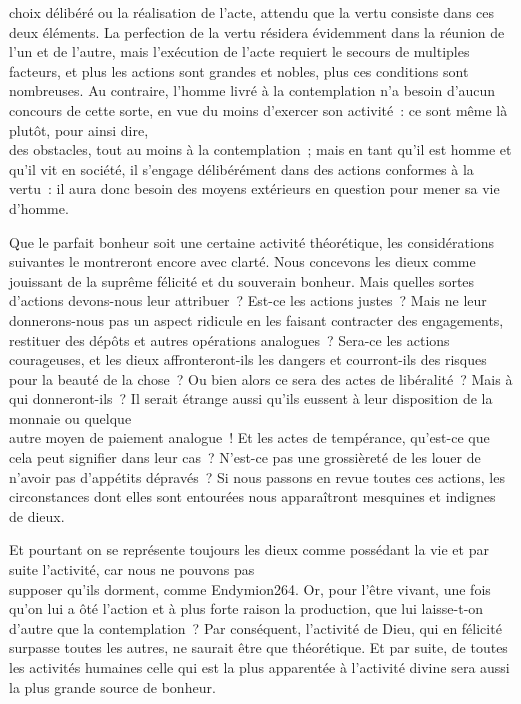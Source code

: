 \documentclass[french,twoside]{book} %
\begin{document}
choix délibéré ou la réalisation de l’acte, attendu que la vertu  consiste dans ces deux éléments. La perfection de la vertu résidera évidemment dans la réunion de l’un et de l’autre, mais l’exécution de l’acte requiert le secours de multiples facteurs, et plus les actions sont grandes et nobles, plus ces conditions sont nombreuses. Au contraire, l’homme livré à la contemplation n’a besoin d’aucun concours de cette sorte, en vue du moins d’exercer son activité : ce sont même là plutôt, pour ainsi dire, \\
des obstacles, tout au moins à la contemplation ; mais en tant qu’il est homme et qu’il vit en société, il s’engage délibérément dans des actions conformes à la vertu : il aura donc besoin des moyens extérieurs en question pour mener sa vie d’homme.\par
Que le parfait bonheur soit une certaine activité théorétique, les considérations suivantes le montreront encore avec clarté. Nous concevons les dieux comme jouissant de la suprême félicité et du souverain bonheur. Mais quelles sortes \\
d’actions devons-nous leur attribuer ? Est-ce les actions justes ? Mais ne leur donnerons-nous pas un aspect ridicule en les faisant contracter des engagements, restituer des dépôts et autres opérations analogues ? Sera-ce les actions courageuses, et les dieux affronteront-ils les dangers et courront-ils des risques pour la beauté de la chose ? Ou bien alors ce sera des actes de libéralité ? Mais à qui donneront-ils ? Il serait étrange aussi qu’ils eussent à leur disposition de la monnaie ou quelque \\
autre moyen de paiement analogue ! Et les actes de tempérance, qu’est-ce que cela peut signifier dans leur cas ? N’est-ce pas une grossièreté de les louer de n’avoir pas d’appétits dépravés ? Si nous passons en revue toutes ces actions, les circonstances dont elles sont entourées nous apparaîtront mesquines et indignes de dieux.\par
Et pourtant on se représente toujours les dieux comme possédant la vie et par suite l’activité, car nous ne pouvons pas \\
supposer qu’ils dorment, comme Endymion264. Or, pour l’être vivant, une fois qu’on lui a ôté l’action et à plus forte raison la production, que lui laisse-t-on d’autre que la contemplation ? Par conséquent, l’activité de Dieu, qui en félicité surpasse toutes les autres, ne saurait être que théorétique. Et par suite, de toutes les activités humaines celle qui est la plus apparentée à l’activité divine sera aussi la plus grande source de bonheur.\par
\end{document}
